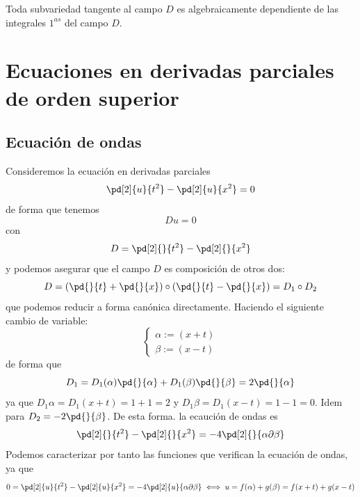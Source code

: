     \begin{prop}
        Toda subvariedad tangente al campo $D$ es algebraicamente dependiente de las integrales $1^{as}$ del campo $D$.
    \end{prop}
    \chapter{Ecuaciones en derivadas parciales de orden superior}
    \section{Ecuación de ondas}
     Consideremos la ecuación en derivadas parciales
    $$\pd[2]{u}{t^2}-\pd[2]{u}{x^2}=0$$
    de forma que tenemos 
    $$Du=0$$
    con $$D=\pd[2]{}{t^2}-\pd[2]{}{x^2}$$
    y podemos asegurar que el campo $D$ es composición de otros dos:
    $$D=\left( \pd{}{t}+ \pd{}{x}\right)\circ \left( \pd{}{t}- \pd{}{x}\right)=D_1 \circ D_2$$
    que podemos reducir a forma canónica directamente. Haciendo el siguiente cambio de variable:
    $$\begin{cases}
        \alpha:= (x+t)\\ \beta :=(x-t)
    \end{cases}$$
    de forma que
    $$D_1=D_1(\alpha) \pd{}{\alpha}+D_1 (\beta) \pd{}{\beta}=2\pd{}{\alpha}$$
    ya que $D_1\alpha=D_1(x+t)=1+1=2$ y $D_1\beta=D_1(x-t)=1-1=0$. Idem para $D_2=-2\pd{}{\beta}$. De esta forma. la ecaución de ondas es
    $$\pd[2]{}{t^2}-\pd[2]{}{x^2}=-4\pd[2]{}{\alpha \partial \beta}$$
    Podemos caracterizar por tanto las funciones que verifican la ecuación de ondas, ya que 
    $$0=\pd[2]{u}{t^2}-\pd[2]{u}{x^2}=-4\pd[2]{u}{\alpha \partial \beta} \iff u = f(\alpha) + g(\beta)=f(x+t)+g(x-t)$$
